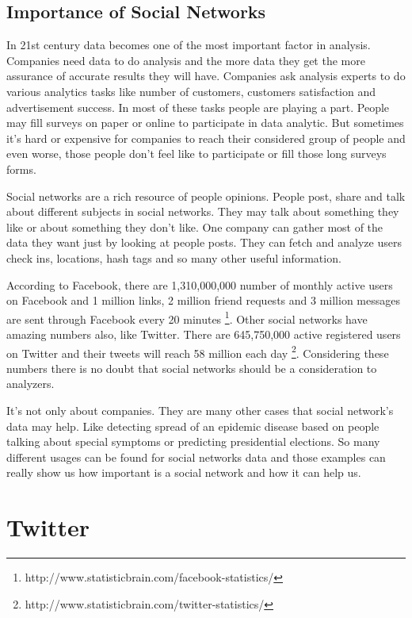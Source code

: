 \documentclass[a4paper,11pt]{report}
\begin{document}
\subsection{Importance of Social Networks}

In 21st century data becomes one of the most important factor in analysis. Companies need data to do analysis and the more data they get the more assurance of accurate results they will have. Companies ask analysis experts to do various analytics tasks like number of customers, customers satisfaction and advertisement success. In most of these tasks people are playing a part. People may fill surveys on paper or online to participate in data analytic. But sometimes it's hard or expensive for companies to reach their considered group of people and even worse, those people don't feel like to participate or fill those long surveys forms.

Social networks are a rich resource of people opinions. People post, share and talk about different subjects in social networks. They may talk about something they like or about something they don't like. One company can gather most of the data they want just by looking at people posts. They can fetch and analyze users check ins, locations, hash tags and so many other useful information.

According to Facebook, there are 1,310,000,000 number of monthly active users on Facebook and 1 million links, 2 million friend requests and 3 million messages are sent through Facebook every 20 minutes
\footnote{http://www.statisticbrain.com/facebook-statistics/}.
Other social networks have amazing numbers also, like Twitter. There are  	645,750,000 active registered users on Twitter and their tweets will reach 58 million each day
\footnote{http://www.statisticbrain.com/twitter-statistics/}.
Considering these numbers there is no doubt that social networks should be a consideration to analyzers.

It's not only about companies. They are many other cases that social network's data may help. Like detecting spread of an epidemic disease based on people talking about special symptoms or predicting presidential elections. So many different usages can be found for social networks data and those examples can really show us how important is a social network and how it can help us.

\section{Twitter}
\end{document}
